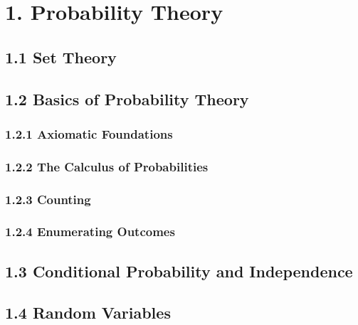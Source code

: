 \documentclass[10pt,twocolumn,portrait]{article}
\begin{document}
\hypertarget{probability-theory}{%
\section{1. Probability Theory}\label{probability-theory}}

\hypertarget{set-theory}{%
\subsection{1.1 Set Theory}\label{set-theory}}

\hypertarget{basics-of-probability-theory}{%
\subsection{1.2 Basics of Probability
Theory}\label{basics-of-probability-theory}}

\hypertarget{axiomatic-foundations}{%
\subsubsection{1.2.1 Axiomatic
Foundations}\label{axiomatic-foundations}}

\hypertarget{the-calculus-of-probabilities}{%
\subsubsection{1.2.2 The Calculus of
Probabilities}\label{the-calculus-of-probabilities}}

\hypertarget{counting}{%
\subsubsection{1.2.3 Counting}\label{counting}}

\hypertarget{enumerating-outcomes}{%
\subsubsection{1.2.4 Enumerating Outcomes}\label{enumerating-outcomes}}

\hypertarget{conditional-probability-and-independence}{%
\subsection{1.3 Conditional Probability and
Independence}\label{conditional-probability-and-independence}}

\hypertarget{random-variables}{%
\subsection{1.4 Random Variables}\label{random-variables}}
\end{document}
